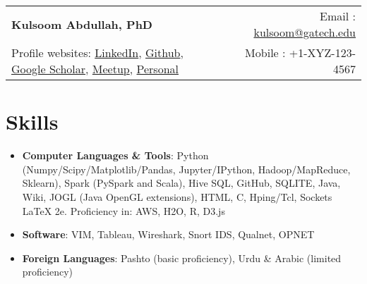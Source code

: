 \documentclass[letterpaper,11pt]{article}
\newcommand{\resumeSubHeadingListStart}{\begin{itemize}[leftmargin=*]}
\newcommand{\resumeSubHeadingListEnd}{\end{itemize}}
\begin{document}
  
  
\begin{tabular*}{\textwidth}{l@{\extracolsep{\fill}}r}
  \textbf{{\Large Kulsoom Abdullah, PhD}} & Email : \href{mailto:kulsoom@gatech.edu}{kulsoom@gatech.edu}\\
  Profile websites: \href{https://www.linkedin.com/in/kulsoomabdullah}{LinkedIn},
  \href{https://github.com/kulsoom-abdullah}{Github}, 
   \href{ https://scholar.google.com/citations?user=-hS4doQAAAAJ&hl=en}{Google Scholar}, 
  \href{https://www.meetup.com/members/88202732/} {Meetup}, \href{http://liftingcovered.com/}{Personal}
  & Mobile : +1-XYZ-123-4567 \\
\end{tabular*}


\section{Skills}
  \resumeSubHeadingListStart
  \itemsep0em 
    \item{
      \textbf{Computer Languages \& Tools}{: Python (Numpy/Scipy/Matplotlib/Pandas, Jupyter/IPython, Hadoop/MapReduce, Sklearn), 
Spark (PySpark and Scala), Hive SQL, GitHub, SQLITE, Java, Wiki, JOGL (Java OpenGL extensions), HTML, C, Hping/Tcl, 
Sockets LaTeX 2e. Proficiency in: AWS, H2O, R, D3.js}
      }

         \item{
      \textbf{Software}{: VIM, Tableau, Wireshark, Snort IDS, Qualnet, OPNET}
      }
      \hfill

   \item{
         \textbf{Foreign Languages}{: Pashto (basic proficiency), Urdu \& Arabic (limited proficiency)}
         }
   
  \resumeSubHeadingListEnd

\end{document}
